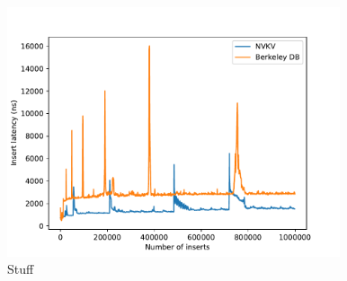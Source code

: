 \begin{figure}
\centering
\hspace*{-0.5in}
\includegraphics[width=98mm]{fig/line}
\caption{Stuff}
\label{fig:line}
\end{figure}


